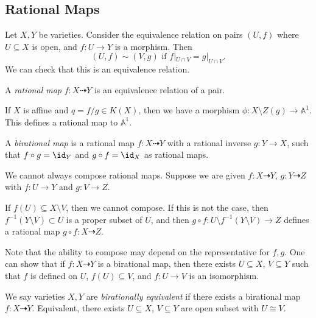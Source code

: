 \documentclass[12pt]{article}
\begin{document}
\subsection{Rational Maps}
\label{sub:rat_map}

Let $X, Y$ be varieties. Consider the equivalence relation on pairs $(U, f)$ where $U \subseteq X$ is open, and $f : U \to Y$ is a morphism. Then
\[
	(U, f) \sim (V, g) \text{ if } f|_{U \cap V} = g|_{U \cap V}.
\]
We can check that this is an equivalence relation.

\begin{definition}
	A \emph{rational map} $f : X \dashrightarrow Y$ is an equivalence relation of a pair.
\end{definition}

\begin{exbox}
	If $X$ is affine and $q = f/g \in K(X)$, then we have a morphism $\phi : X \setminus Z(g) \to \mathbb{A}^1$. This defines a rational map to $\mathbb{A}^1$.
\end{exbox}


\begin{definition}
	A \emph{birational map} is a rational map $f : X \dashrightarrow Y$ with a rational inverse $g : Y \to X$, such that $f \circ g = \id_Y$ and $g \circ f = \id_X$ as rational maps.
\end{definition}

\begin{remark}
	We cannot always compose rational maps. Suppose we are given $f : X \dashrightarrow Y$, $g : Y \dashrightarrow Z$ with $f : U \to Y$ and $g : V \to Z$.

	If $f(U) \subseteq X \setminus V$, then we cannot compose. If this is not the case, then $f^{-1}(Y \setminus V) \subset U$ is a proper subset of $U$, and then $g \circ f : U \setminus f^{-1}(Y \setminus V) \to Z$ defines a rational map $g \circ f : X \dashrightarrow Z$.
\end{remark}

Note that the ability to compose may depend on the representative for $f, g$. One can show that if $f : X \dashrightarrow Y$ is a birational map, then there exists $U \subseteq X$, $V \subseteq Y$ such that $f$ is defined on $U$, $f(U) \subseteq V$, and $f : U \to V$ is an isomorphism.

\begin{definition}
	We say varieties $X, Y$ are \emph{birationally equivalent} if there exists a birational map $f : X \dashrightarrow Y$. Equivalent, there exists $U \subseteq X$, $V \subseteq Y$ are open subset with $U \cong V$.
\end{definition}
\end{document}

